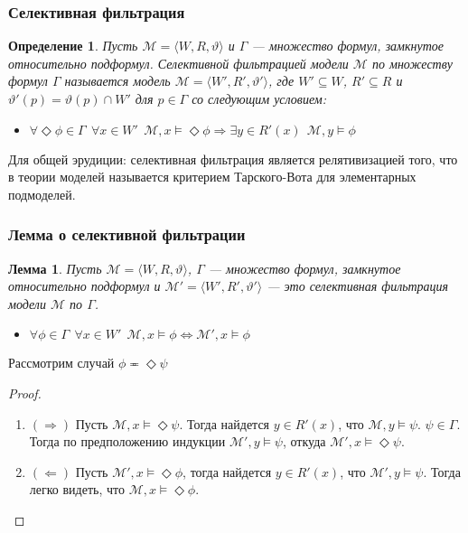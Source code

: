 \documentclass[pdf,utf8,russian,aspectratio=169]{beamer}
\newtheorem{defin}{Определение}
\newtheorem{lem}{Лемма}
\begin{document}
\begin{frame}
  \frametitle{Селективная фильтрация}
  \begin{defin}
    Пусть $\mathcal{M} = \langle W, R, \vartheta \rangle$ и $\Gamma$ --- множество формул, замкнутое относительно подформул.
    Селективной фильтрацией модели $\mathcal{M}$ по множеству формул $\Gamma$ называется модель $\mathcal{M} = \langle W', R', \vartheta' \rangle$, где
    $W' \subseteq W$, $R' \subseteq R$ и $\vartheta'(p) = \vartheta(p) \cap W'$ для $p \in \Gamma$ со следующим условием:

    \begin{itemize}
      \item $\forall \Diamond \phi \in \Gamma \:\: \forall x \in W' \:\: \mathcal{M}, x \models \Diamond \phi \Rightarrow \exists y \in R'(x) \:\: \mathcal{M}, y \models \phi$
    \end{itemize}
  \end{defin}

Для общей эрудиции: селективная фильтрация является релятивизацией того, что в теории моделей называется критерием Тарского-Вота для элементарных подмоделей.
\end{frame}

\begin{frame}
    \frametitle{Лемма о селективной фильтрации}

    \begin{lem}
      Пусть $\mathcal{M} = \langle W, R, \vartheta \rangle$, $\Gamma$ --- множество формул, замкнутое относительно подформул и
      $\mathcal{M}' = \langle W', R', \vartheta' \rangle$ --- это селективная фильтрация модели $\mathcal{M}$ по $\Gamma$.

      \begin{itemize}
        \item $\forall \phi \in \Gamma \:\: \forall x \in W' \:\: \mathcal{M}, x \models \phi \Leftrightarrow \mathcal{M}', x \models \phi$
      \end{itemize}
    \end{lem}

Рассмотрим случай $\phi \eqcirc \Diamond \psi$
    \begin{proof}
      \begin{enumerate}
      \item $(\Rightarrow)$ Пусть $\mathcal{M}, x \models \Diamond \psi$.
      Тогда найдется $y \in R'(x)$, что $\mathcal{M}, y \models \psi$. $\psi \in \Gamma$.
      Тогда
      по предположению индукции $\mathcal{M}', y \models \psi$, откуда $\mathcal{M}', x \models \Diamond \psi$.
      \item $(\Leftarrow)$ Пусть $\mathcal{M}', x \models \Diamond \phi$, тогда найдется $y \in R'(x)$, что $\mathcal{M}', y \models \psi$. Тогда легко видеть, что $\mathcal{M}, x \models \Diamond \phi$.
    \end{enumerate}
  \end{proof}
\end{frame}
\end{document}
